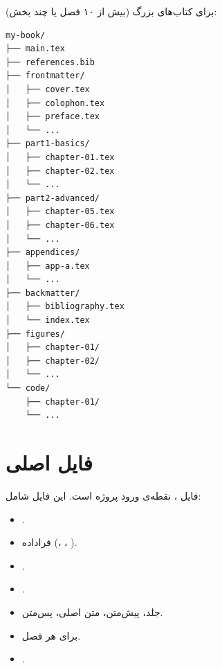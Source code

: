 برای کتاب‌های بزرگ (بیش از ۱۰ فصل یا
چند بخش):

\begin{latin}
\begin{verbatim}
my-book/
├── main.tex
├── references.bib
├── frontmatter/
│   ├── cover.tex
│   ├── colophon.tex
│   ├── preface.tex
│   └── ...
├── part1-basics/
│   ├── chapter-01.tex
│   ├── chapter-02.tex
│   └── ...
├── part2-advanced/
│   ├── chapter-05.tex
│   ├── chapter-06.tex
│   └── ...
├── appendices/
│   ├── app-a.tex
│   └── ...
├── backmatter/
│   ├── bibliography.tex
│   └── index.tex
├── figures/
│   ├── chapter-01/
│   ├── chapter-02/
│   └── ...
└── code/
    ├── chapter-01/
    └── ...
\end{verbatim}
\end{latin}


\section{فایل اصلی}
\label{sec:large-projects-main}

فایل ، نقطه‌ی ورود پروژه
است. این فایل شامل:

\begin{itemize}
    \item {}.
    \item فراداده (، ،
    ).
    \item {}.
    \item {}.
    \item جلد، پیش‌متن، متن اصلی، پس‌متن.
    \item {} برای هر فصل.
    \item {}.
\end{itemize}

